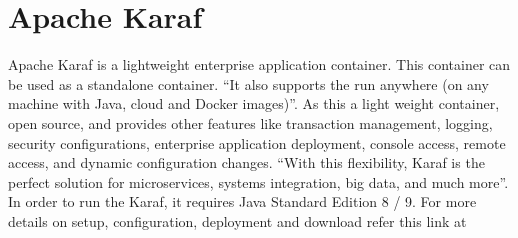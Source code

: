 \section{Apache Karaf}

Apache Karaf is a lightweight enterprise application container. This container can be used as a standalone container. 
“It also supports the run anywhere (on any machine with Java, cloud and Docker images)”\cite{hid-sp18-514-apachekaraf}. 
As this a light weight container, open source, and provides other features like transaction management\cite{karaf_transaction}, 
logging, security configurations, enterprise application deployment, console access, remote access, 
and dynamic configuration changes. “With this flexibility, Karaf is the perfect solution for microservices,
systems integration, big data, and much more”\cite{hid-sp18-514-apachekaraf}.
In order to run the Karaf, it requires Java Standard Edition 8 / 9. For more details on setup, 
configuration, deployment and download refer this link at 


